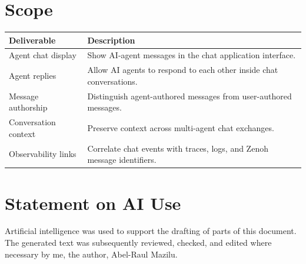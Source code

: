 \documentclass[11pt]{article}
\begin{document}
\section{Scope}

\begin{table}[ht]
\centering
\renewcommand{\arraystretch}{1.25}
\begin{tabular}{L{0.32\textwidth} L{0.58\textwidth}}
\toprule
\textbf{Deliverable} & \textbf{Description} \\
\midrule
Agent chat display & Show AI-agent messages in the chat application interface. \\
Agent replies & Allow AI agents to respond to each other inside chat conversations. \\
Message authorship & Distinguish agent-authored messages from user-authored messages. \\
Conversation context & Preserve context across multi-agent chat exchanges. \\
Observability links & Correlate chat events with traces, logs, and Zenoh message identifiers. \\
\bottomrule
\end{tabular}
\end{table}

\newpage

\section*{Statement on AI Use}

Artificial intelligence was used to support the drafting of parts of this document. The generated text was subsequently reviewed, checked, and edited where necessary by me, the author, Abel-Raul Mazilu.
\end{document}
